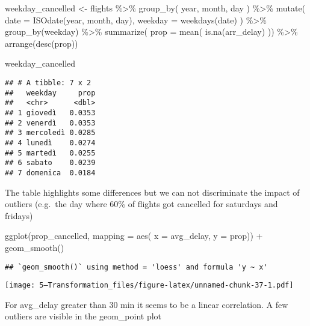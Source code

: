 \documentclass[
]{article}
\newenvironment{Shaded}{\begin{snugshade}}{\end{snugshade}}
\newcommand{\AttributeTok}[1]{\textcolor[rgb]{0.77,0.63,0.00}{#1}}
\newcommand{\FunctionTok}[1]{\textcolor[rgb]{0.00,0.00,0.00}{#1}}
\newcommand{\NormalTok}[1]{#1}
\newcommand{\OtherTok}[1]{\textcolor[rgb]{0.56,0.35,0.01}{#1}}
\newcommand{\SpecialCharTok}[1]{\textcolor[rgb]{0.00,0.00,0.00}{#1}}
\begin{document}
\begin{Shaded}
\begin{Highlighting}[]
\NormalTok{weekday\_cancelled }\OtherTok{\textless{}{-}}\NormalTok{ flights }\SpecialCharTok{\%\textgreater{}\%} 
  \FunctionTok{group\_by}\NormalTok{( year, month, day ) }\SpecialCharTok{\%\textgreater{}\%} 
  \FunctionTok{mutate}\NormalTok{( }\AttributeTok{date =} \FunctionTok{ISOdate}\NormalTok{(year, month, day),}
          \AttributeTok{weekday =} \FunctionTok{weekdays}\NormalTok{(date) ) }\SpecialCharTok{\%\textgreater{}\%} 
  \FunctionTok{group\_by}\NormalTok{(weekday) }\SpecialCharTok{\%\textgreater{}\%} 
  \FunctionTok{summarize}\NormalTok{( }\AttributeTok{prop =} \FunctionTok{mean}\NormalTok{( }\FunctionTok{is.na}\NormalTok{(arr\_delay) )) }\SpecialCharTok{\%\textgreater{}\%} 
  \FunctionTok{arrange}\NormalTok{(}\FunctionTok{desc}\NormalTok{(prop))}

\NormalTok{weekday\_cancelled}
\end{Highlighting}
\end{Shaded}

\begin{verbatim}
## # A tibble: 7 x 2
##   weekday     prop
##   <chr>      <dbl>
## 1 giovedì   0.0353
## 2 venerdì   0.0353
## 3 mercoledì 0.0285
## 4 lunedì    0.0274
## 5 martedì   0.0255
## 6 sabato    0.0239
## 7 domenica  0.0184
\end{verbatim}

The table highlights some differences but we can not discriminate the
impact of outliers (e.g.~the day where 60\% of flights got cancelled for
saturdays and fridays)

\begin{Shaded}
\begin{Highlighting}[]
\FunctionTok{ggplot}\NormalTok{(prop\_cancelled, }\AttributeTok{mapping =} \FunctionTok{aes}\NormalTok{( }\AttributeTok{x =}\NormalTok{ avg\_delay, }\AttributeTok{y =}\NormalTok{ prop)) }\SpecialCharTok{+}
  \FunctionTok{geom\_smooth}\NormalTok{()}
\end{Highlighting}
\end{Shaded}

\begin{verbatim}
## `geom_smooth()` using method = 'loess' and formula 'y ~ x'
\end{verbatim}

\texttt{[image: 5---Transformation\_files/figure-latex/unnamed-chunk-37-1.pdf]}

For avg\_delay greater than 30 min it seems to be a linear correlation.
A few outliers are visible in the geom\_point plot
\end{document}
